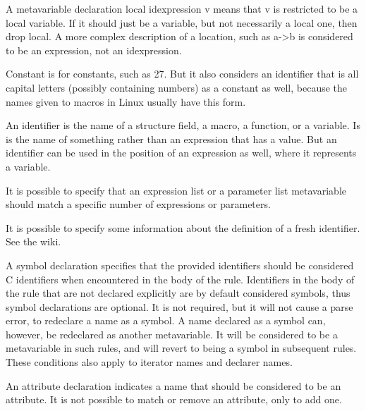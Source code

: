 \begin{grammar}



\end{grammar}

A metavariable declaration local idexpression v means that v is restricted
to be a local variable.  If it should just be a variable, but not
necessarily a local one, then drop local.  A more complex description of a
location, such as a->b is considered to be an expression, not an
idexpression.

Constant is for constants, such as 27.  But it also considers an identifier
that is all capital letters (possibly containing numbers) as a constant as
well, because the names given to macros in Linux usually have this form.

An identifier is the name of a structure field, a macro, a function, or a
variable.  Is is the name of something rather than an expression that has a
value.  But an identifier can be used in the position of an expression as
well, where it represents a variable.

It is possible to specify that an expression list or a parameter list
metavariable should match a specific number of expressions or parameters.

It is possible to specify some information about the definition of a fresh
identifier.  See the wiki.

A symbol declaration specifies that the provided identifiers should be
considered C identifiers when encountered in the body of the rule.
Identifiers in the body of the rule that are not declared explicitly are by
default considered symbols, thus symbol declarations are optional.  It is
not required, but it will not cause a parse error, to redeclare a name as a
symbol.  A name declared as a symbol can, however, be redeclared as another
metavariable.  It will be considered to be a metavariable in such rules,
and will revert to being a symbol in subsequent rules.  These conditions
also apply to iterator names and declarer names.

An attribute declaration indicates a name that should be considered to be
an attribute.  It is not possible to match or remove an attribute, only to
add one.

